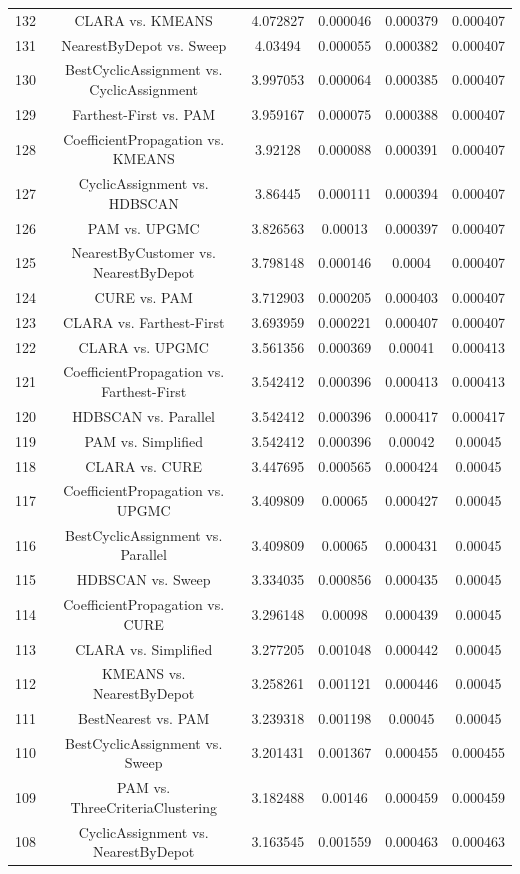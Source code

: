 \documentclass[a4paper,10pt]{article}
\begin{document}
\begin{landscape}
\begin{table}[!htp]
\begin{tabular}{cccccc}
132&CLARA vs. KMEANS&4.072827&0.000046&0.000379&0.000407\\
131&NearestByDepot vs. Sweep&4.03494&0.000055&0.000382&0.000407\\
130&BestCyclicAssignment vs. CyclicAssignment&3.997053&0.000064&0.000385&0.000407\\
129&Farthest-First vs. PAM&3.959167&0.000075&0.000388&0.000407\\
128&CoefficientPropagation vs. KMEANS&3.92128&0.000088&0.000391&0.000407\\
127&CyclicAssignment vs. HDBSCAN&3.86445&0.000111&0.000394&0.000407\\
126&PAM vs. UPGMC&3.826563&0.00013&0.000397&0.000407\\
125&NearestByCustomer vs. NearestByDepot&3.798148&0.000146&0.0004&0.000407\\
124&CURE vs. PAM&3.712903&0.000205&0.000403&0.000407\\
123&CLARA vs. Farthest-First&3.693959&0.000221&0.000407&0.000407\\
122&CLARA vs. UPGMC&3.561356&0.000369&0.00041&0.000413\\
121&CoefficientPropagation vs. Farthest-First&3.542412&0.000396&0.000413&0.000413\\
120&HDBSCAN vs. Parallel&3.542412&0.000396&0.000417&0.000417\\
119&PAM vs. Simplified&3.542412&0.000396&0.00042&0.00045\\
118&CLARA vs. CURE&3.447695&0.000565&0.000424&0.00045\\
117&CoefficientPropagation vs. UPGMC&3.409809&0.00065&0.000427&0.00045\\
116&BestCyclicAssignment vs. Parallel&3.409809&0.00065&0.000431&0.00045\\
115&HDBSCAN vs. Sweep&3.334035&0.000856&0.000435&0.00045\\
114&CoefficientPropagation vs. CURE&3.296148&0.00098&0.000439&0.00045\\
113&CLARA vs. Simplified&3.277205&0.001048&0.000442&0.00045\\
112&KMEANS vs. NearestByDepot&3.258261&0.001121&0.000446&0.00045\\
111&BestNearest vs. PAM&3.239318&0.001198&0.00045&0.00045\\
110&BestCyclicAssignment vs. Sweep&3.201431&0.001367&0.000455&0.000455\\
109&PAM vs. ThreeCriteriaClustering&3.182488&0.00146&0.000459&0.000459\\
108&CyclicAssignment vs. NearestByDepot&3.163545&0.001559&0.000463&0.000463\\

\end{tabular}
\end{table}
\end{landscape}
\end{document}

